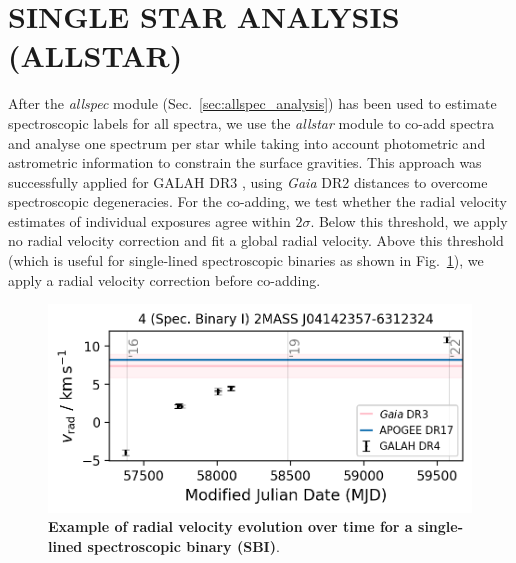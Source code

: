 \documentclass[
  journal=pasa,
  manuscript=research-paper, %
  year=2023,
  volume=37
]{cup-journal}
\newcommand{\Gaia}{\textit{Gaia}\xspace}
\begin{document}
\section{SINGLE STAR ANALYSIS (ALLSTAR)}
\label{sec:allstar_analysis}

After the \textit{allspec} module (Sec.~\ref{sec:allspec_analysis}) has been used to estimate spectroscopic labels for all spectra, we use the \textit{allstar} module to co-add spectra and analyse one spectrum per star while taking into account photometric and astrometric information to constrain the surface gravities. This approach was successfully applied for GALAH DR3 \citep{Buder2021}, using \Gaia DR2 distances \citep{BailerJones2018} to overcome spectroscopic degeneracies. For the co-adding, we test whether the radial velocity estimates of individual exposures agree within $2\sigma$. Below this threshold, we apply no radial velocity correction and fit a global radial velocity. Above this threshold (which is useful for single-lined spectroscopic binaries 
as shown in Fig.~\ref{fig:examples_flag_sp_2}), we apply a radial velocity correction before co-adding.

\begin{figure}[ht]
 \centering
 \includegraphics[width=\textwidth]{figures/examples_flag_sp_2.png}
 \caption{\textbf{Example of radial velocity evolution over time for a single-lined spectroscopic binary (SBI)}.}
 \label{fig:examples_flag_sp_2}
\end{figure}
\end{document}
